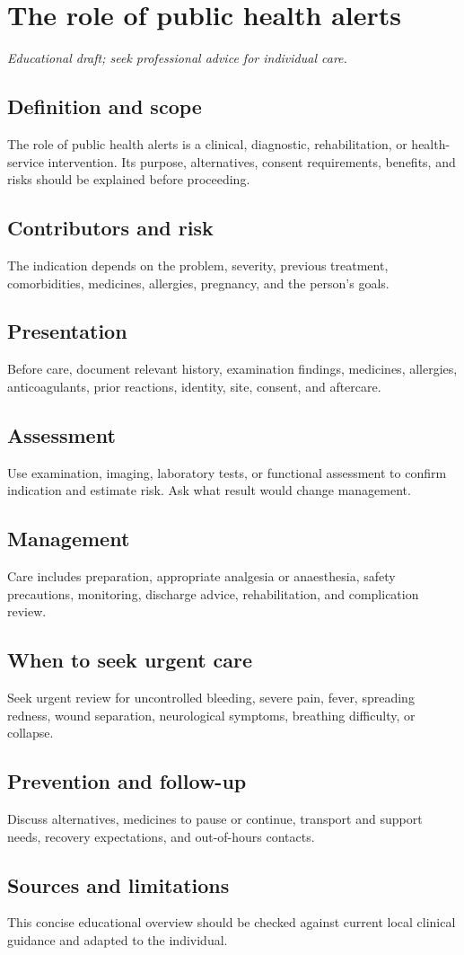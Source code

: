 \chapter{The role of public health alerts}
\medskip
\noindent\textit{Educational draft; seek professional advice for individual care.}

\section*{Definition and scope}
The role of public health alerts is a clinical, diagnostic, rehabilitation, or health-service intervention. Its purpose, alternatives, consent requirements, benefits, and risks should be explained before proceeding.

\section*{Contributors and risk}
The indication depends on the problem, severity, previous treatment, comorbidities, medicines, allergies, pregnancy, and the person’s goals.

\section*{Presentation}
Before care, document relevant history, examination findings, medicines, allergies, anticoagulants, prior reactions, identity, site, consent, and aftercare.

\section*{Assessment}
Use examination, imaging, laboratory tests, or functional assessment to confirm indication and estimate risk. Ask what result would change management.

\section*{Management}
Care includes preparation, appropriate analgesia or anaesthesia, safety precautions, monitoring, discharge advice, rehabilitation, and complication review.

\section*{When to seek urgent care}
Seek urgent review for uncontrolled bleeding, severe pain, fever, spreading redness, wound separation, neurological symptoms, breathing difficulty, or collapse.

\section*{Prevention and follow-up}
Discuss alternatives, medicines to pause or continue, transport and support needs, recovery expectations, and out-of-hours contacts.

\section*{Sources and limitations}
This concise educational overview should be checked against current local clinical guidance and adapted to the individual.
